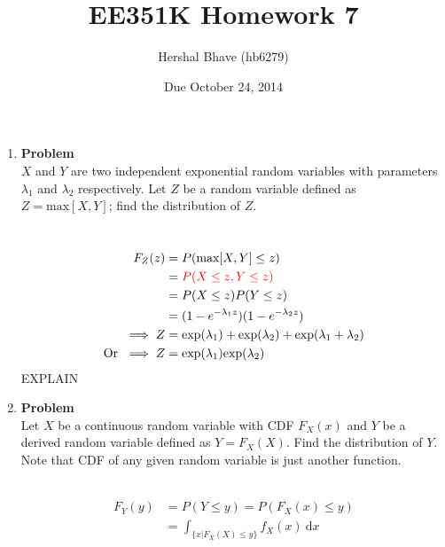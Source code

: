 \documentclass[12pt]{article}
\title{EE351K Homework 7}
\author{Hershal Bhave (hb6279)}
\date{Due October 24, 2014}
\newenvironment{Ex}{\textbf{Problem}\vspace{.75em}\\}{}
\newcommand{\dd}[1]{\:\mathrm{d}{#1}}
\begin{document}
\maketitle
\begin{enumerate}
\item
  \begin{Ex}
    $X$ and $Y$ are two independent exponential random variables with
    parameters $\lambda_1$ and $\lambda_2$ respectively. Let $Z$ be a
    random variable defined as $Z = \text{max}[X,Y]$; find the
    distribution of $Z$.
    \begin{solution} \hfill \vspace{.75em} \\
      \begin{equation}
        \label{eq:1-sol}
        \begin{aligned}
          F_Z(z) &= P(\text{max}[X,Y] \le z) \\
          &= {\color{red} P(X \le z, Y \le z)} \\
          &= P(X\le z)P(Y\le z) \\
          &= (1-e^{-\lambda_1 z})(1-e^{-\lambda_2 z}) \\
          \implies Z &= \text{exp}(\lambda_1) + \text{exp}(\lambda_2)
          + \text{exp}(\lambda_1 + \lambda_2) \\
          \text{Or }\implies Z &=
          \text{exp}(\lambda_1)\text{exp}(\lambda_2) \\
        \end{aligned}
      \end{equation}
      {\color{red} \huge EXPLAIN}
    \end{solution}
  \end{Ex}
\item
  \begin{Ex}
    Let $X$ be a continuous random variable with CDF $F_X(x)$ and $Y$
    be a derived random variable defined as $Y = F_X(X)$. Find the
    distribution of $Y$.  Note that CDF of any given random variable
    is just another function.
    \begin{solution} \hfill \vspace{.75em} \\
      \begin{equation}
        \label{eq:2-presol}
        \begin{aligned}
          F_Y(y) &= P(Y\le y) = P(F_X(x)\le y) \\
          &= \int_{\{x|F_X(X) \le y\}}f_X(x) \dd{x} \\

\end{aligned}
\end{equation}
\end{solution}
\end{Ex}
\end{enumerate}
\end{document}
